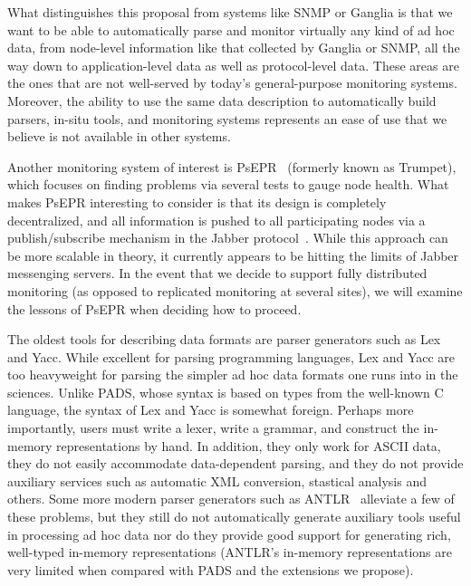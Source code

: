 \documentclass[10pt]{article}
\begin{document}
What distinguishes this proposal from systems like SNMP or Ganglia is
that we want to be able to automatically parse and monitor virtually
any kind of ad hoc data, from node-level information like that
collected by Ganglia or SNMP, all the way down to application-level
data as well as protocol-level data. These areas are the ones that are
not well-served by today's general-purpose monitoring
systems. Moreover, the ability to use the same data description to
automatically build parsers, in-situ tools, and monitoring systems
represents an ease of use that we believe is not available in other
systems.

Another monitoring system of interest is PsEPR~\cite{psepr} (formerly
known as Trumpet), which focuses on finding problems via several tests
to gauge node health. What makes PsEPR interesting to consider is that
its design is completely decentralized, and all information is pushed
to all participating nodes via a publish/subscribe mechanism in the
Jabber protocol~\cite{jabber}. While this approach can be more
scalable in theory, it currently appears to be hitting the limits of
Jabber messenging servers. In the event that we decide to support
fully distributed monitoring (as opposed to replicated monitoring at
several sites), we will examine the lessons of PsEPR when deciding how
to proceed.


The oldest tools for describing data formats are parser generators such as
Lex and Yacc.  While excellent for parsing programming languages, Lex and Yacc
are too heavyweight for parsing the simpler ad hoc data formats one
runs into in the sciences.   
Unlike PADS, whose syntax is based on types from the well-known C language,
the syntax of Lex and Yacc is somewhat foreign.  Perhaps more importantly,
users must write a lexer, write a
grammar, and construct the in-memory representations by hand.  In
addition, they only work for ASCII data, they do not easily
accommodate data-dependent parsing, and they do not provide auxiliary
services such as automatic XML conversion, stastical analysis and
others.  Some more modern parser generators such as ANTLR~\cite{antlr} alleviate
a few of these problems, but they still do not automatically generate auxiliary tools
useful in processing ad hoc data nor do they provide good support for generating
rich, well-typed in-memory representations (ANTLR's in-memory representations
are very limited when compared with PADS and the extensions we propose).
\end{document}
